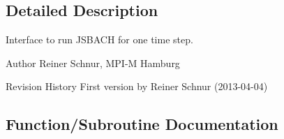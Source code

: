 \subsection{Detailed Description}
Interface to run J\+S\+B\+A\+C\+H for one time step. 

\begin{DoxyAuthor}{Author}
Reiner Schnur, M\+P\+I-\/\+M Hamburg
\end{DoxyAuthor}
\begin{DoxyParagraph}{Revision History}
First version by Reiner Schnur (2013-\/04-\/04) 
\end{DoxyParagraph}


\subsection{Function/\+Subroutine Documentation}
\hypertarget{namespacemo__jsb__interface_a669b978bf786a78426b4aa57d8c8f7b1}{}
